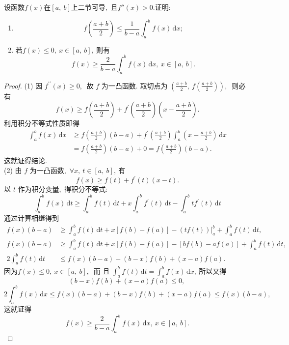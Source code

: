 	\newpage
	\begin{problem}
		设函数$f(x)$在$[a,\ b]$上二节可导,\ 且$f''(x)>0.$证明:
		\begin{enumerate}
			\item $$f\left(\frac{a+b}{2}\right)\leqslant\frac{1}{b-a}\int_{a}^{b}f(x)\,\text{d}x;$$
			\item 若$f(x)\leqslant 0,\ x\in[a,\ b],\ $则有$$f(x)\geqslant\frac{2}{b-a}\int_{a}^{b}f(x)\,\text{d}x,\ x\in[a,\ b].$$
		\end{enumerate}
	\end{problem}
	\begin{proof}
		(1) 因  $f^{\prime \prime}(x) \geqslant 0 ,\ $ 故  $f $ 为一凸函数. 取切点为  $\left(\frac{a+b}{2},\  f\left(\frac{a+b}{2}\right)\right) ,\ $ 则必有
		$$f(x) \geqslant f\left(\frac{a+b}{2}\right)+f^{\prime}\left(\frac{a+b}{2}\right)\left(x-\frac{a+b}{2}\right) .$$
		利用积分不等式性质即得
		$$\begin{aligned}
			\int_{a}^{b} f(x) \,\mathrm{d} x & \geqslant f\left(\frac{a+b}{2}\right)(b-a)+f^{\prime}\left(\frac{a+b}{2}\right) \int_{a}^{b}\left(x-\frac{a+b}{2}\right) \,\mathrm{d} x \\
			& =f\left(\frac{a+b}{2}\right)(b-a)+0=f\left(\frac{a+b}{2}\right)(b-a) .
		\end{aligned}$$
		这就证得结论.\\
		(2) 由 $ f $ 为一凸函数,\  $ \forall x,\  t \in[a,\  b] ,\  $有
		$$f(x) \geqslant f(t)+f^{\prime}(t)(x-t) .$$
		以 $t$  作为积分变量,\ 得积分不等式:
		$$\int_{a}^{b} f(x) \,\mathrm{d} t \geqslant \int_{a}^{b} f(t) \,\mathrm{d} t+x \int_{a}^{b} f^{\prime}(t) \,\mathrm{d} t-\int_{a}^{b} t f^{\prime}(t) \,\mathrm{d} t$$
		通过计算相继得到	
		$$\begin{aligned}
			f(x)(b-a) & \geqslant \int_{a}^{b} f(t) \,\mathrm{d} t+x[f(b)-f(a)]-\left.(t f(t))\right|_{a} ^{b}+\int_{a}^{b} f(t) \,\mathrm{d} t,\  \\
			f(x)(b-a) & \geqslant \int_{a}^{b} f(t) \,\mathrm{d} t+x[f(b)-f(a)]-[b f(b)-a f(a)]+\int_{a}^{b} f(t) \,\mathrm{d} t,\  \\
			2 \int_{a}^{b} f(t) \,\mathrm{d} t & \leqslant f(x)(b-a)+(b-x) f(b)+(x-a) f(a) .
		\end{aligned}$$
		因为$  f(x) \leqslant 0,\  x \in[a,\  b] ,\ $ 而 且  $\int_{a}^{b} f(t) \,\mathrm{d} t=\int_{a}^{b} f(x) \,\mathrm{d} x ,\  $所以又得
		$$(b-x) f(b)+(x-a) f(a) \leqslant 0,\ $$
		$$2 \int_{a}^{b} f(x) \,\mathrm{d} x \leqslant f(x)(b-a)+(b-x) f(b)+(x-a) f(a) \leqslant f(x)(b-a),\ $$
		这就证得$$ f(x) \geqslant \frac{2}{b-a} \int_{a}^{b} f(x) \,\mathrm{d} x,\  x \in[a,\  b] .$$
	\end{proof}
